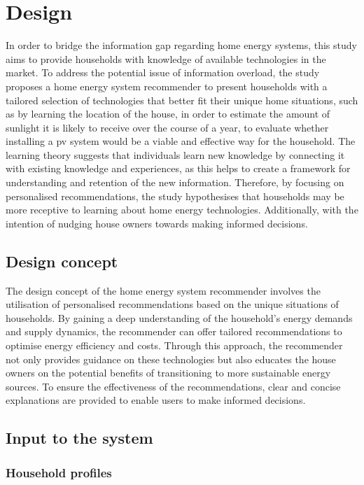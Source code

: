 \chapter{Design} 

In order to bridge the information gap regarding home energy systems, this study aims to provide households with knowledge of available technologies in the market. 
To address the potential issue of information overload, the study proposes a home energy system recommender to present households with a tailored selection of technologies that better fit their unique home situations, 
such as by learning the location of the house, in order to estimate the amount of sunlight it is likely to receive over the course of a year, to evaluate whether installing a \gls{pv} system would be a viable and effective way for the household.
The learning theory suggests that individuals learn new knowledge by connecting it with existing knowledge and experiences, as this helps to create a framework for understanding and retention of the new information.
Therefore, by focusing on personalised recommendations, the study hypothesises that households may be more receptive to learning about home energy technologies. 
Additionally, with the intention of nudging house owners towards making informed decisions. 

\section{Design concept}
The design concept of the home energy system recommender involves the utilisation of personalised recommendations based on the unique situations of households. 
By gaining a deep understanding of the household's energy demands and supply dynamics, the recommender can offer tailored recommendations to optimise energy efficiency and costs. 
Through this approach, the recommender not only provides guidance on these technologies but also educates the house owners on the potential benefits of transitioning to more sustainable energy sources. 
To ensure the effectiveness of the recommendations, clear and concise explanations are provided to enable users to make informed decisions.


\section{Input to the system}


\subsection{Household profiles}

